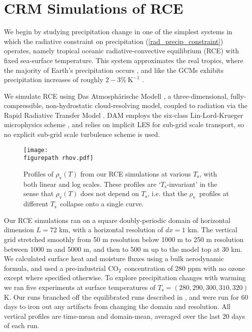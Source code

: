 \documentclass[10pt]{article}
\newcommand{\eqnref}[1]{(\ref{#1})}
\newcommand{\cotwo}{\ensuremath{\mathrm{CO_2}}}
\newcommand{\rhov}{\ensuremath{\rho_\mathrm{v}}}
\newcommand{\Ts}{\ensuremath{T_\mathrm{s}}}
\newcommand{\Kinverse}{\ensuremath{\mathrm{K^{-1}}}}
\newcommand{\figurepath}{../figures/}
\begin{document}
\section{CRM Simulations of RCE}
We begin by studying precipitation change in one of the simplest systems in which the radiative constraint on precipitation \eqnref{rad_precip_constraint} operates, namely tropical oceanic radiative-convective equilibrium (RCE) with fixed sea-surface temperature. This system approximates the real tropics, where the majority of Earth's precipitation occurs \citep{simpson1988}, and like the GCMs exhibits precipitation increases of roughly $2 -3\%\ \Kinverse$ \citep{romps2011, muller2011b}.  

We simulate RCE using Das Atmosph\"arische Modell \citep[DAM,][]{romps2008},   a three-dimensional, fully-compressible, non-hydrostatic cloud-resolving model, coupled to radiation via the Rapid Radiative Transfer Model 
\citep[RRTM,][]{mlawer1997}. DAM employs the six-class Lin-Lord-Krueger  microphysics scheme \citep{lin1983, lord1984, krueger1995}, and relies on implicit LES \citep{margolin2006} for sub-grid scale transport, so no explicit sub-grid scale turbulence scheme is used.

\begin{figure}[t]
	\begin{center}
			\texttt{[image: \\figurepath rhov.pdf]}
		\caption{Profiles of $\rhov(T)$ from our RCE simulations at various \Ts, with both linear and log scales. These profiles are `\Ts-invariant' in the sense that $\rhov(T)$ does not depend on \Ts, i.e. that the \rhov\ profiles at different \Ts\ collapse onto a single curve.
		\label{rhov_fig}
		}
	\end{center}
\end{figure}

	
	Our RCE simulations ran on a square doubly-periodic domain of horizontal dimension $L=72$ km, with  a horizontal resolution of $dx=1$ km. The vertical grid stretched smoothly from 50 m resolution below 1000 m to 250 m resolution between 1000 m and 5000 m, and then to 500 m up to the model top at  30 km. We calculated surface heat and moisture fluxes using a bulk aerodynamic formula, and used a pre-industrial \cotwo\  concentration of 280 ppm with no ozone except where specified otherwise. To explore precipitation changes  with warming we ran five experiments at surface temperatures of $\Ts=(280,290,300,310,320)$ K. Our runs branched off the equilibrated runs described in \cite{romps2014}, and were run for 60 days  to iron out any artifacts from changing the domain and resolution. All vertical profiles are time-mean and domain-mean, averaged over the last 20 days of each run. 
\end{document}

